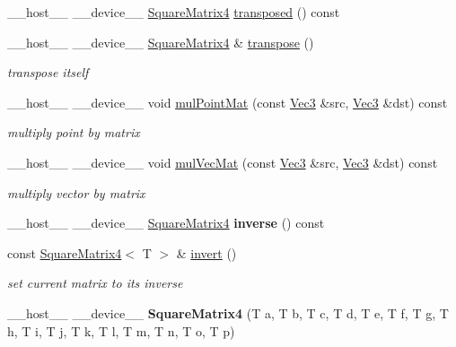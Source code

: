 \begin{DoxyCompactItemize}
\item 
\+\_\+\+\_\+host\+\_\+\+\_\+ \+\_\+\+\_\+device\+\_\+\+\_\+ \hyperlink{class_square_matrix4}{Square\+Matrix4} \hyperlink{class_square_matrix4_a23f36c4b337c5b238b4d3fae04e6f2f0}{transposed} () const
\item 
\+\_\+\+\_\+host\+\_\+\+\_\+ \+\_\+\+\_\+device\+\_\+\+\_\+ \hyperlink{class_square_matrix4}{Square\+Matrix4} \& \hyperlink{class_square_matrix4_a7d6f675b8ae538a7c53fe1e8c390e8b3}{transpose} ()\hypertarget{class_square_matrix4_a7d6f675b8ae538a7c53fe1e8c390e8b3}{}\label{class_square_matrix4_a7d6f675b8ae538a7c53fe1e8c390e8b3}

\begin{DoxyCompactList}\small\item\em transpose itself \end{DoxyCompactList}\item 
\+\_\+\+\_\+host\+\_\+\+\_\+ \+\_\+\+\_\+device\+\_\+\+\_\+ void \hyperlink{class_square_matrix4_a96f083743422ca964d865b1034e608b4}{mul\+Point\+Mat} (const \hyperlink{class_vec3}{Vec3} \&src, \hyperlink{class_vec3}{Vec3} \&dst) const
\begin{DoxyCompactList}\small\item\em multiply point by matrix \end{DoxyCompactList}\item 
\+\_\+\+\_\+host\+\_\+\+\_\+ \+\_\+\+\_\+device\+\_\+\+\_\+ void \hyperlink{class_square_matrix4_a559765a38296c2949976c00347098fb0}{mul\+Vec\+Mat} (const \hyperlink{class_vec3}{Vec3} \&src, \hyperlink{class_vec3}{Vec3} \&dst) const
\begin{DoxyCompactList}\small\item\em multiply vector by matrix \end{DoxyCompactList}\item 
\+\_\+\+\_\+host\+\_\+\+\_\+ \+\_\+\+\_\+device\+\_\+\+\_\+ \hyperlink{class_square_matrix4}{Square\+Matrix4} {\bfseries inverse} () const\hypertarget{class_square_matrix4_a5af6eeea8a8080858fc607a7e6a25c79}{}\label{class_square_matrix4_a5af6eeea8a8080858fc607a7e6a25c79}

\item 
const \hyperlink{class_square_matrix4}{Square\+Matrix4}$<$ T $>$ \& \hyperlink{class_square_matrix4_acbf913e66c1c7b846bc25d7b2c0df31d}{invert} ()\hypertarget{class_square_matrix4_acbf913e66c1c7b846bc25d7b2c0df31d}{}\label{class_square_matrix4_acbf913e66c1c7b846bc25d7b2c0df31d}

\begin{DoxyCompactList}\small\item\em set current matrix to its inverse \end{DoxyCompactList}\item 
\+\_\+\+\_\+host\+\_\+\+\_\+ \+\_\+\+\_\+device\+\_\+\+\_\+ {\bfseries Square\+Matrix4} (T a, T b, T c, T d, T e, T f, T g, T h, T i, T j, T k, T l, T m, T n, T o, T p)\hypertarget{class_square_matrix4_a9182db1e12bd3ff20d7ccdf5ed25c156}{}\label{class_square_matrix4_a9182db1e12bd3ff20d7ccdf5ed25c156}


\end{DoxyCompactItemize}
